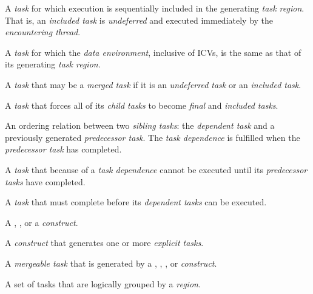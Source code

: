 \glossarydefstart
A \emph{task} for which execution is sequentially included in the generating \emph{task region}. 
That is, an \emph{included task} is \emph{undeferred} and executed immediately by the 
\emph{encountering thread}.
\glossarydefend

\glossarydefstart
A \emph{task} for which the \emph{data environment}, inclusive of ICVs, is the same as that of its 
generating \emph{task region}.
\glossarydefend

\glossarydefstart
A \emph{task} that may be a \emph{merged task} if it is an \emph{undeferred task} or an \emph{included task}.
\glossarydefend

\glossarydefstart
A \emph{task} that forces all of its \emph{child tasks} to become \emph{final} and \emph{included tasks}.
\glossarydefend

\glossarydefstart
An ordering relation between two \emph{sibling tasks}: the \emph{dependent task} and a 
previously generated \emph{predecessor task}. The \emph{task dependence} is fulfilled when the 
\emph{predecessor task} has completed.
\glossarydefend

\begin{samepage}
\glossarydefstart
A \emph{task} that because of a \emph{task dependence} cannot be executed until its \emph{predecessor 
tasks} have completed.
\glossarydefend
\end{samepage}

\glossarydefstart
A \emph{task} that must complete before its \emph{dependent tasks} can be executed.
\glossarydefend

\glossarydefstart
A , , or a  \emph{construct}.
\glossarydefend
\bigskip

\glossarydefstart
A \emph{construct} that generates one or more \emph{explicit tasks}.
\glossarydefend
\bigskip

\glossarydefstart
A \emph{mergeable task} that is generated by a , , , or  \emph{construct}.
\glossarydefend

\glossarydefstart
A set of tasks that are logically grouped by a  \emph{region}.
\glossarydefend

